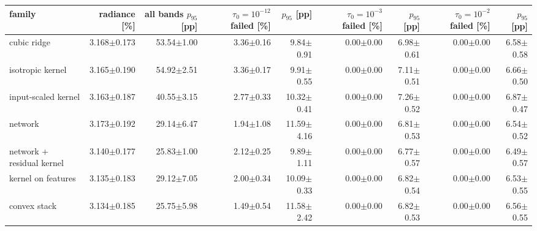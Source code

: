 \begin{tabular}{lrrrrrrrr}
\toprule
family & radiance [\%] & \thead{all bands\\$p_{95}$ [pp]} & \thead{$\tau_0=10^{-12}$\\failed [\%]} & $p_{95}$ [pp] & \thead{$\tau_0=10^{-3}$\\failed [\%]} & $p_{95}$ [pp] & \thead{$\tau_0=10^{-2}$\\failed [\%]} & $p_{95}$ [pp] \\
\midrule
cubic ridge & 3.168$\pm$0.173 & 53.54$\pm$1.00 & 3.36$\pm$0.16 & 9.84$\pm$0.91 & 0.00$\pm$0.00 & 6.98$\pm$0.61 & 0.00$\pm$0.00 & 6.58$\pm$0.58 \\
isotropic kernel & 3.165$\pm$0.190 & 54.92$\pm$2.51 & 3.36$\pm$0.17 & 9.91$\pm$0.55 & 0.00$\pm$0.00 & 7.11$\pm$0.51 & 0.00$\pm$0.00 & 6.66$\pm$0.50 \\
input-scaled kernel & 3.163$\pm$0.187 & 40.55$\pm$3.15 & 2.77$\pm$0.33 & 10.32$\pm$0.41 & 0.00$\pm$0.00 & 7.26$\pm$0.52 & 0.00$\pm$0.00 & 6.87$\pm$0.47 \\
network & 3.173$\pm$0.192 & 29.14$\pm$6.47 & 1.94$\pm$1.08 & 11.59$\pm$4.16 & 0.00$\pm$0.00 & 6.81$\pm$0.53 & 0.00$\pm$0.00 & 6.54$\pm$0.52 \\
network + residual kernel & 3.140$\pm$0.177 & 25.83$\pm$1.00 & 2.12$\pm$0.25 & 9.89$\pm$1.11 & 0.00$\pm$0.00 & 6.77$\pm$0.57 & 0.00$\pm$0.00 & 6.49$\pm$0.57 \\
kernel on features & 3.135$\pm$0.183 & 29.12$\pm$7.05 & 2.00$\pm$0.34 & 10.09$\pm$0.33 & 0.00$\pm$0.00 & 6.82$\pm$0.54 & 0.00$\pm$0.00 & 6.53$\pm$0.55 \\
convex stack & 3.134$\pm$0.185 & 25.75$\pm$5.98 & 1.49$\pm$0.54 & 11.58$\pm$2.42 & 0.00$\pm$0.00 & 6.82$\pm$0.53 & 0.00$\pm$0.00 & 6.56$\pm$0.55 \\
\bottomrule
\end{tabular}
